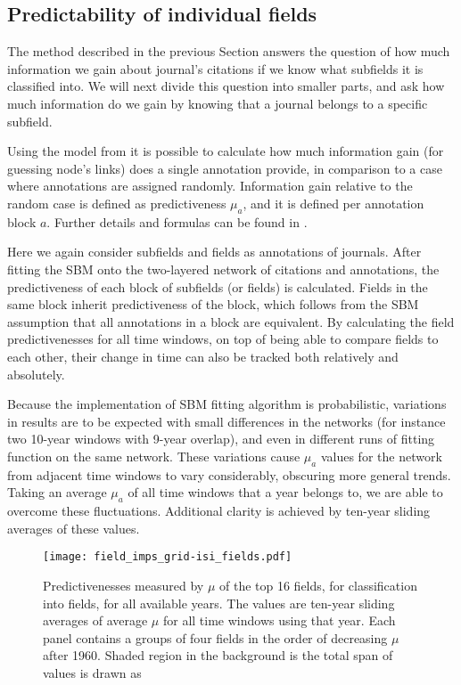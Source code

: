 \documentclass[a4paper,12pt]{article}
\begin{document}
\subsection{Predictability of individual fields}
\label{sec:pred-field}

The method described in the previous Section answers the question of how much information 
we gain about journal's citations if we know what subfields it is classified into.
We will next divide this question into
smaller parts, and ask how much information do we gain by knowing that a journal belongs to a specific subfield.


Using the model from \citet{Hric2016} it is possible to calculate how much information gain (for 
guessing node's links) does a single annotation provide, in comparison to a case where 
annotations are assigned randomly. Information gain relative to the random case is 
defined as predictiveness 
$\mu_a$, and it is defined per annotation block $a$. Further 
details and formulas can be found in \citet{Hric2016}.

Here we again consider subfields and fields as annotations of journals.
After fitting the SBM onto the
two-layered network of citations and annotations,
the predictiveness 
of each block of subfields (or fields) is calculated.
Fields in the same block inherit predictiveness 
of the block, which follows from the SBM assumption that all annotations in a block are equivalent.
By calculating the field predictivenesses 
for all time windows, on top of being able to compare
fields to each other, their change in time can also be tracked both relatively and absolutely.

Because the implementation of SBM fitting algorithm is probabilistic, variations in results 
are to be expected with small differences in the networks (for instance two 10-year 
windows with 9-year overlap), and even in different runs of fitting function on the same 
network. These variations cause $\mu_a$ values for the network 
from adjacent time windows to vary considerably, obscuring more general trends.
Taking an average $\mu_a$ of all time windows that a year belongs to, we are able to
overcome these fluctuations. Additional clarity is achieved by ten-year sliding averages of these values.

\begin{figure}
      \centering
      \texttt{[image: field\_imps\_grid-isi\_fields.pdf]}
  \caption{Predictivenesses measured by $\mu$ of the top 16 fields, for classification 
into fields, for all available years. The values are ten-year sliding averages of average
$\mu$ for all time windows using that year.
Each panel contains a groups of four fields in the order of decreasing $\mu$ after 1960.
Shaded region in the background is the total span of values is drawn as 
}
  \label{fig:field_imps}
\end{figure}
\end{document}
